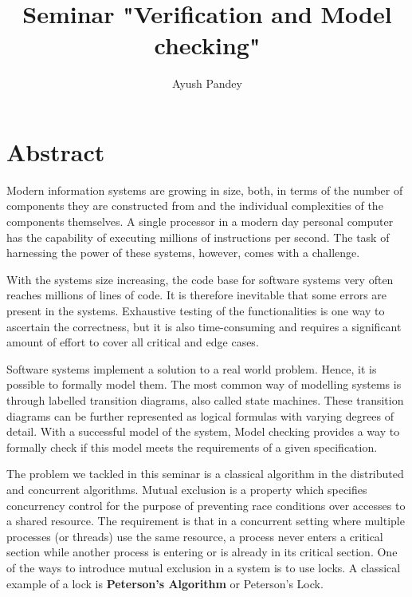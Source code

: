 \documentclass[fleqn]{tukseminar}
\title{Seminar "Verification and Model checking"}
\author{Ayush Pandey
			\institute{Technische Universität Kaiserslautern, Department of Computer Science}}
\begin{document}
			
			\maketitle
			
			
			\begin{abstract}
				
			\end{abstract}
			
			
			\section{Abstract}
			\label{sec:introduction}
			Modern information systems are growing in size, both, in terms of the number of components they are constructed from and the individual complexities of the components themselves. A single processor in a modern day personal computer has the capability of executing millions of instructions per second. The task of harnessing the power of these systems, however, comes with a challenge.
			
			With the systems size increasing, the code base for software systems very often reaches millions of lines of code. It is therefore inevitable that some errors are present in the systems. Exhaustive testing of the functionalities is one way to ascertain the correctness, but it is also time-consuming and requires a significant amount of effort to cover all critical and edge cases.
			
			Software systems implement a solution to a real world problem. Hence, it is possible to formally model them. The most common way of modelling systems is through labelled transition diagrams, also called state machines. These transition diagrams can be further represented as logical formulas with varying degrees of detail. With a successful model of the system, Model checking provides a way to formally check if this model meets the requirements of a given specification.
			
			The problem we ta\label{key}ckled in this seminar is a classical algorithm in the distributed and concurrent algorithms. Mutual exclusion\cite{wiki:mutex} is a property which specifies concurrency control for the purpose of preventing race conditions over accesses to a shared resource. The requirement is that in a concurrent setting where multiple processes (or threads) use the same resource, a process never enters a critical section while another process is entering or is already in its critical section. One of the ways to introduce mutual exclusion in a system is to use locks. A classical example of a lock is \textbf{Peterson's Algorithm} or Peterson's Lock.
			
\end{document}
